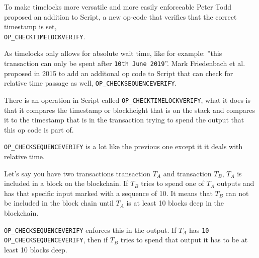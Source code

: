 To make timelocks more versatile and more easily enforceable Peter Todd proposed an addition to Script, a new op-code that verifies that the correct timestamp is set, \\\texttt{OP\_CHECKTIMELOCKVERIFY}.

As timelocks only allows for absolute wait time, like for example: ''this transaction can only be spent after \texttt{10th June 2019}''. Mark Friedenbach et al. proposed in 2015 to add an additonal op code to Script that can check for relative time passage as well, \texttt{OP\_CHECKSEQUENCEVERIFY}.

There is an operation in Script called \texttt{OP\_CHECKTIMELOCKVERIFY}, what it does is that it compares the timestamp or blockheight that is on the stack and compares it to the timestamp that is in the transaction trying to spend the output that this op code is part of.\cite{antonopoulos_2017}\cite{checklocktime}\cite{script_wiki}\cite{bitcoin_core_tx}

\texttt{OP\_CHECKSEQUENCEVERIFY} is a lot like the previous one except it it deals with relative time. 

Let's say you have two transactions transaction $T_A$ and transaction $T_B$, $T_A$ is included in a block on the blockchain. If $T_B$ tries to spend one of $T_A$ outputs and has that specific input marked with a  sequence of 10. It means that $T_B$ can not be included in the block chain until $T_A$ is at least 10 blocks deep in the blockchain.\cite{antonopoulos_2017}\cite{checksequence}\cite{script_wiki}\cite{bitcoin_core_tx}

\texttt{OP\_CHECKSEQUENCEVERIFY} enforces this in the output. If $T_A$ has \texttt{10 OP\_CHECKSEQUENCEVERIFY}, then if $T_B$ tries to spend that output it has to be at least 10 blocks deep.
